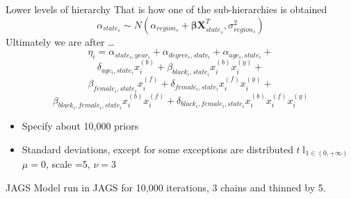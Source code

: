 \documentclass{beamer}
\begin{document}
	\begin{frame}{Lower levels of hierarchy}
		That is how one of the sub-hierarchies is obtained
			\[
			\alpha_{state_s} \sim N(\alpha_{region_s} + \bm{\beta X}^{T}_{state_s}, \sigma^2_{region_s}   )
			\]
			Ultimately we are after \dots
						 $$ \eta_i = \alpha_{state_i, year_i} + \alpha_{degree_i, state_i} + \alpha_{age_i, state_i} +  $$
						 $$ \delta_{age_i, state_i}x^{(b)}_i + \beta_{black_i, state_i}x^{(b)}_ix^{(y)}_i  + $$
						 $$ \beta_{female_i, state_i} x^{(f)}_i +  \delta_{female_i, state_i}x^{(f)}_ix^{(y)}_i  + $$ 
						 $$ \beta_{black_i, female_i, state_i}x^{(b)}_ix^{(f)}_i + \delta_{black_i, female_i, state_i}x^{(b)}_ix^{(f)}_ix^{(y)}_i $$
		\begin{itemize}
			\item Specify about 10,000 priors 
			\item Standard deviations, except for some exceptions are distributed $ t  \ \mathbb{I}_{1\in(0,+\infty)} $ $ \mu=0 $, scale =5, $ \nu =3 $ 
		\end{itemize}
		\end{frame}
	\begin{frame}{JAGS}
		Model run in JAGS for 10,000 iterations, 3 chains and thinned by 5. 
	\end{frame}
	
\end{document}

